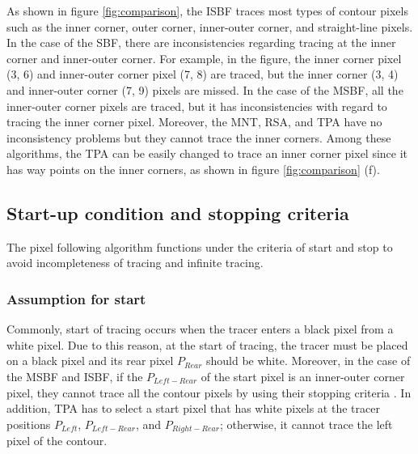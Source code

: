 As shown in figure \ref{fig:comparison}, the ISBF traces most types of contour pixels such as the inner corner, outer corner, inner-outer corner, and straight-line pixels. In the case of the SBF, there are inconsistencies regarding tracing at the inner corner and inner-outer corner. For example, in the figure, the inner corner pixel (3, 6) and inner-outer corner pixel (7, 8) are traced, but the inner corner (3, 4) and inner-outer corner (7, 9) pixels are missed. In the case of the MSBF, all the inner-outer corner pixels are traced, but it has inconsistencies with regard to tracing the inner corner pixel. Moreover, the MNT, RSA, and TPA have no inconsistency problems but they cannot trace the inner corners. Among these algorithms, the TPA can be easily changed to trace an inner corner pixel since it has way points on the inner corners, as shown in figure \ref{fig:comparison} (f). 



\subsection{Start-up condition and stopping criteria}

The pixel following algorithm functions under the criteria of start and stop to avoid incompleteness of tracing and infinite tracing.

\subsubsection{Assumption for start}
Commonly, start of tracing occurs when the tracer enters a black pixel from a white pixel. Due to this reason, at the start of tracing, the tracer must be placed on a black pixel and its rear pixel $P_{Rear}$ should be white. Moreover, in the case of the MSBF and ISBF, if the $P_{Left-Rear}$ of the start pixel is an inner-outer corner pixel, they cannot trace all the contour pixels by using their stopping criteria \cite{Cheong2006Advanced}. In addition, TPA has to select a start pixel that has white pixels at the tracer positions $P_{Left}$, $P_{Left-Rear}$, and $P_{Right-Rear}$\cite{Ghuneim2000Contour}; otherwise, it cannot trace the left pixel of the contour. 

